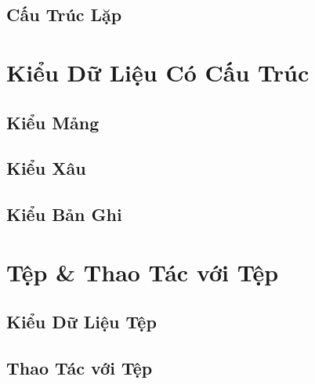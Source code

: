 \documentclass[oneside]{book}
\numberwithin{equation}{section}
\begin{document}

\section{Cấu Trúc Lặp}


\chapter{Kiểu Dữ Liệu Có Cấu Trúc}

\section{Kiểu Mảng}


\section{Kiểu Xâu}


\section{Kiểu Bản Ghi}


\chapter{Tệp \& Thao Tác với Tệp}

\section{Kiểu Dữ Liệu Tệp}


\section{Thao Tác với Tệp}

\end{document}

